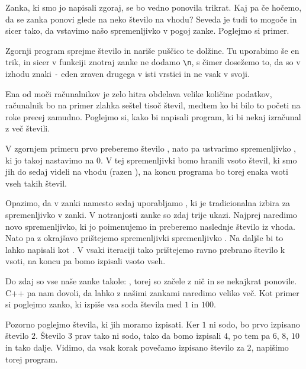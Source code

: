 

Zanka, ki smo jo napisali zgoraj, se bo vedno ponovila trikrat.
Kaj pa če hočemo, da se zanka ponovi glede na neko število na vhodu?
Seveda je tudi to mogoče in sicer tako, da vstavimo našo spremenljivko v pogoj
zanke.
Poglejmo si primer.


Zgornji program sprejme število in nariše puščico te dolžine.
Tu uporabimo še en trik, in sicer v funkciji  znotraj zanke ne
dodamo \verb+\n+, s čimer dosežemo to, da so v izhodu znaki \verb+-+ eden zraven
drugega v isti vrstici in ne vsak v svoji.


Ena od moči računalnikov je zelo hitra obdelava velike količine podatkov,
računalnik bo na primer zlahka seštel tisoč števil, medtem ko bi bilo to početi
na roke precej zamudno.
Poglejmo si, kako bi napisali program, ki bi nekaj izračunal z več števili.


V zgornjem primeru prvo preberemo število , nato pa ustvarimo
spremenljivko , ki jo takoj nastavimo na $0$.
V tej spremenljivki bomo hranili vsoto števil, ki smo jih do sedaj videli
na vhodu (razen ), na koncu programa bo torej enaka vsoti vseh takih
števil.

Opazimo, da v zanki namesto  sedaj uporabljamo , ki je
tradicionalna izbira za spremenljivko v zanki.
V notranjosti zanke so zdaj trije ukazi.
Najprej naredimo novo spremenljivko, ki jo poimenujemo  in
preberemo naslednje število iz vhoda.
Nato pa z okrajšavo  prištejemo spremenljivki
 spremenljivko .
Na daljše bi to lahko napisali kot .
V vsaki iteraciji tako prištejemo ravno prebrano število k vsoti, na koncu pa
bomo izpisali vsoto vseh.


Do zdaj so vse naše zanke takole:
, torej so začele z nič in se nekajkrat
ponovile.
C++ pa nam dovoli, da lahko z našimi zankami naredimo veliko več.
Kot primer si poglejmo zanko, ki izpiše vsa soda števila med $1$ in $100$.

Pozorno poglejmo števila, ki jih moramo izpisati.
Ker $1$ ni sodo, bo prvo izpisano število $2$.
Število $3$ prav tako ni sodo, tako da bomo izpisali $4$, po tem pa $6$, $8$,
$10$ in tako dalje.
Vidimo, da vsak korak povečamo izpisano število za $2$, napišimo torej program.

